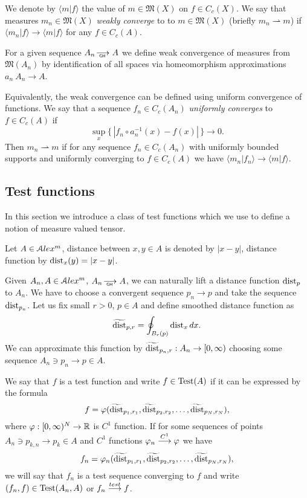 We  denote by $\langle m|f\rangle $ the value of
$m\in\mathfrak M(X)$
 on $f\in C_c(X)$.
 We say that measures $m_n\in \mathfrak M(X)$ 
\emph{weakly converge} to
to $m\in \mathfrak M(X)$ (briefly
$m_n\rightharpoonup m$)
if $\langle m_n|f\rangle \to \langle m|f\rangle $ for
any
$f\in C_c(A)$.

For a given  sequence $A_n\GHto A$
we define weak convergence of  measures from
$\mathfrak M(A_n)$
by identification of all spaces via homeomorphism
approximations $a_n\:A_n\to A$.

Equivalently, the weak convergence can be defined using uniform convergence of functions.
We say that  a sequence $f_n\in C_c(A_n)$
\emph{uniformly converges} to $f\in C_c(A)$
if 
\[\sup_x\{\,|f_n\circ a_n^{-1}(x)-f(x)|\,\}\to 0.\]
Then  $m_n\rightharpoonup m$
if for any sequence $f_n\in C_c(A_n)$
with uniformly bounded supports and
uniformly converging to $f\in C_c(A)$
we have $\langle m_n|f_n\rangle \to \langle m|f\rangle $.


\subsection{Test functions}
In this section we introduce a class of test functions
which we use
to define  a notion of measure valued tensor.

Let $A\in \mathcal{A}lex^m$, distance between $x,y\in A$ is denoted by $|x-y|$,
distance function  by $\operatorname{dist}_x(y)=|x-y|$.



Given $A_n, A\in \mathcal{A}lex^m$,  $A_n\GHto A$,
we can naturally lift a distance function $\operatorname{dist}_p$ to $A_n$.
We have to choose a convergent sequence $p_n\to p$ and take the
sequence $\operatorname{dist}_{p_n}$.
Let us fix small $r>0$,
$p\in A$
and define smoothed distance function as 
$$\widetilde{\operatorname{dist}}_{p,r} =\oint_{B_r(p)} \operatorname{dist}_{x}dx.$$ 
We can approximate this function by
$\widetilde{\operatorname{dist}}_{p_n,r}:A_n\to [0,\infty)  $
 choosing
  some  sequence $A_n\ni p_n\to p\in A$.

We say that $f$ is a test function
and write $f\in \operatorname{Test}(A)$ if it can be expressed by the formula
$$f=\varphi( \widetilde{\operatorname{dist}}_{p_1,r_1}, \widetilde{\operatorname{dist}}_{p_2,r_2},\dots,   \widetilde{\operatorname{dist}}_{p_N,r_N}),$$
where $\varphi:[0,\infty)^N\to\mathbb{R}$ is  $C^1$ function.
If for some sequences of points $A_n\ni p_{k,n}\to p_k\in A$
and $C^1$ functions   
$\varphi_n\stackrel{C^1}{\longrightarrow} \varphi$ we have
$$f_n=\varphi_n( \widetilde{\operatorname{dist}}_{p_1,r_1}, \widetilde{\operatorname{dist}}_{p_2,r_2},\dots,   \widetilde{\operatorname{dist}}_{p_N,r_N}),$$
we will say that $f_n$ is a test sequence converging to $f$ and write
$(f_n,f)\zz\in \Test(A_n,A)$ or $f_n\stackrel{test}{\longrightarrow} f$.

